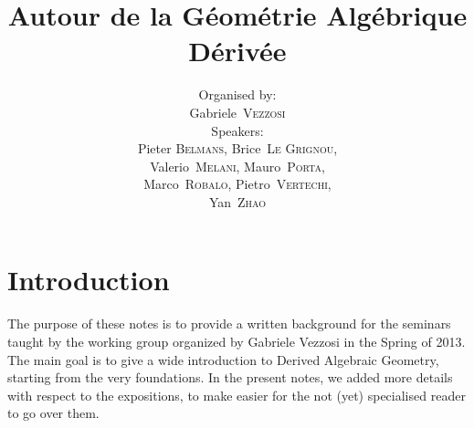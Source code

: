 \documentclass[a4paper]{memoir}
\title{Autour de la G\'eom\'etrie Alg\'ebrique D\'eriv\'ee}
\author{
Organised by: \\[.2em]
\hspace*{.5cm} Gabriele~\textsc{Vezzosi} \\[.4em] Speakers: \\[.2em]
\hspace*{.5cm} Pieter \textsc{Belmans}, Brice~\textsc{Le Grignou}, \\
\hspace*{.5cm} Valerio~\textsc{Melani}, Mauro~\textsc{Porta},\\
\hspace*{.5cm} Marco~\textsc{Robalo}, Pietro~\textsc{Vertechi},\\
\hspace*{.5cm} Yan~\textsc{Zhao}
}
\theoremstyle{definition}
\theoremstyle{definition}
\theoremstyle{remark}
\begin{document}

\makeatletter
\renewcommand{\cfttocbeforelisthook}{\pagestyle{simple}\let\ps@plain\ps@empty}
\renewcommand{\cfttocafterlisthook}{\cleardoublepage\pagestyle{headings}}
\makeatother

\frontmatter

\tableofcontents*

\pagestyle{headings}

\chapter*{Introduction}

The purpose of these notes is to provide a written background for the seminars taught by the working group organized by Gabriele Vezzosi in the Spring of 2013. The main goal is to give a wide introduction to Derived Algebraic Geometry, starting from the very foundations. In the present notes, we added more details with respect to the expositions, to make easier for the not (yet) specialised reader to go over them.
\end{document}
